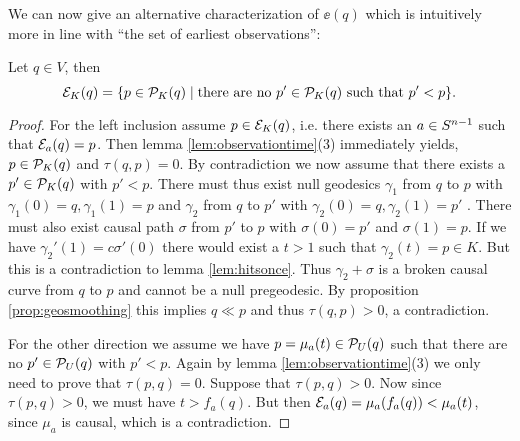 We can now give an alternative characterization of $\ee(q)$ which is intuitively more in line with \enquote{the set of earliest observations}:
\begin{proposition}\label{prop:seocharact}
Let $q\in V$, then 
\begin{equation*}
    \mc{E}_K(q) = \{ p \in \P_K(q) \mid \text{there are no $p'\in \P_K(q)$ such that $p' < p$} \}.
\end{equation*}
\end{proposition}
\begin{proof}
For the left inclusion assume $p\in \mc{E}_K(q)$, i.e. there exists an $a\in \sn$ such that $\mc{E}_a(q)=p$. Then lemma \ref{lem:observationtime}(3) immediately yields, $p\in \P_K(q)$ and  $\tau(q,p)=0$.
By contradiction we now assume that there exists a $p'\in \pq$ with $p'<p$. There must thus exist null geodesics $\gamma_1$ from $q$ to $p$ with $\gamma_1(0)=q, \gamma_1(1)=p$ and $\gamma_2$ from $q$ to $p'$ with $\gamma_2(0)=q, \gamma_2(1)=p'$ . There must also exist causal path $\sigma$ from $p'$ to $p$ with $\sigma(0)=p'$ and $\sigma(1)=p$. If we have $\gamma_2'(1) = c\sigma'(0)$ there would exist a $t>1$ such that $\gamma_2(t)=p\in K$. But this is a contradiction to lemma \ref{lem:hitsonce}. Thus $\gamma_2 + \sigma$ is a broken causal curve from $q$ to $p$ and cannot be a null pregeodesic. By proposition \ref{prop:geosmoothing} this implies $q\ll p$ and thus $\tau(q,p)>0$, a contradiction.

For the other direction we assume we have $p=\mu_a(t) \in \P_U(q)$ such that there are no $p'\in\P_U(q)$ with $p' < p$. Again by lemma \ref{lem:observationtime}(3) we only need to prove that $\tau(p,q)=0$. Suppose that $\tau(p,q)>0$. Now since $\tau(p,q)>0$, we must have $t > f_a(q)$. But then $\mc{E}_a(q) = \mu_a(f_a(q)) < \mu_a(t)$, since $\mu_a$ is causal, which is a contradiction.
\end{proof}

